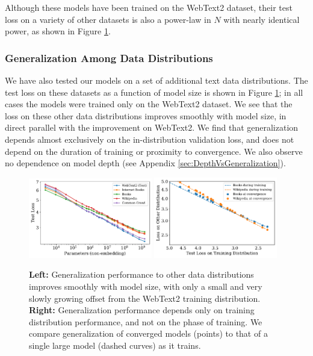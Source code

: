 \documentclass[english]{article}
\begin{document}
Although these models have been trained on the WebText2 dataset, their test loss on a variety of other datasets is also a power-law in $N$ with nearly identical power, as shown in Figure \ref{fig:GeneralizationVsModelSize}.  

\subsubsection{Generalization Among Data Distributions}
\label{sec:GeneralizationtoOtherDistributions}


We have also tested our models on a set of additional text data distributions.  The test loss on these datasets as a function of model size is shown in Figure \ref{fig:GeneralizationVsModelSize}; in all cases the models were trained only on the WebText2 dataset.  We see that the loss on these other data distributions improves smoothly with model size, in direct parallel with the improvement on WebText2.  We find that generalization depends almost exclusively on the in-distribution validation loss, and does not depend on the duration of training or proximity to convergence. We also observe no dependence on model depth (see Appendix \ref{sec:DepthVsGeneralization}).

\begin{figure}
\noindent \centering{} \includegraphics[width=0.48\textwidth]{GeneralizationVsModelSize}\hfill
\noindent \centering{} \includegraphics[width=0.48\textwidth]{TrainingVsConvergence}
\caption[Generalization to other test datasets]{
\textbf{Left:} Generalization performance to other data distributions improves smoothly with model size, with only a small and very slowly growing offset from the WebText2 training distribution.
\textbf{Right:} Generalization performance depends only on training distribution performance, and not on the phase of training.  We compare generalization of converged models (points) to that of a single large model (dashed curves) as it trains.
\label{fig:GeneralizationVsModelSize}}
\end{figure}
\end{document}
